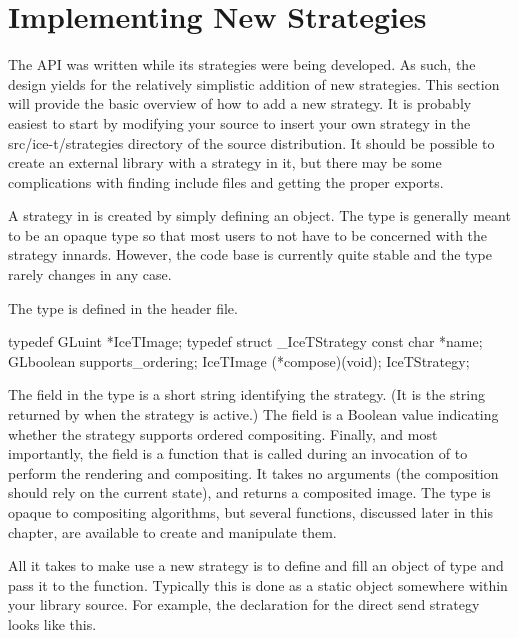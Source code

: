 \section{Implementing New Strategies}

The \IceT API was written while its strategies were being developed.  As
such, the design yields for the relatively simplistic addition of new
strategies.  This section will provide the basic overview of how to add a
new strategy.  It is probably easiest to start by modifying your \IceT
source to insert your own strategy in the src/ice-t/strategies directory of
the \IceT source distribution.  It should be possible to create an external
library with a strategy in it, but there may be some complications with
finding include files and getting the proper exports.

A strategy in \IceT is created by simply defining an 
object.  The  type is generally meant to be an opaque
type so that most users to not have to be concerned with the strategy
innards.  However, the \IceT code base is currently quite stable and the
 type rarely changes in any case.

The  type is defined in the
 header file.
\begin{code}
typedef GLuint *IceTImage;
typedef struct _IceTStrategy {
    const char *name;
    GLboolean supports_ordering;
    IceTImage (*compose)(void);
} IceTStrategy;
\end{code}
The  field in the  type is a short string
identifying the strategy.  (It is the string returned by
 when the strategy is active.)  The
 field is a Boolean value indicating whether the
strategy supports ordered compositing.  Finally, and most importantly, the
 field is a function that is called during an invocation of
 to perform the rendering and compositing.  It takes
no arguments (the composition should rely on the current \IceT state), and
returns a composited image.  The  type is opaque to
compositing algorithms, but several functions, discussed later in this
chapter, are available to create and manipulate them.

All it takes to make \IceT use a new strategy is to define and fill an
object of type  and pass it to the 
function.  Typically this is done as a static object somewhere within your
library source.  For example, the declaration for the direct send strategy
looks like this.

